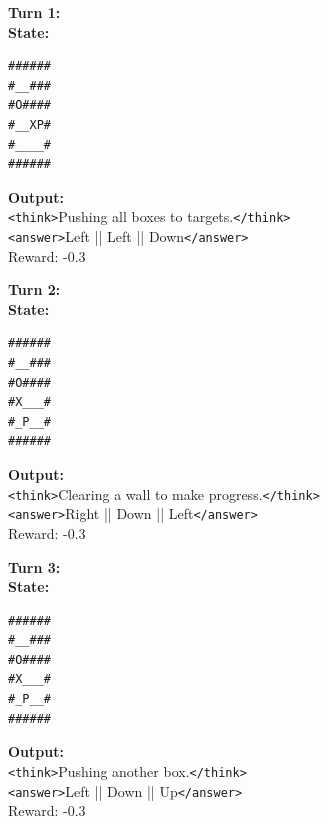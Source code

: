 \begin{figure}[t]
\centering
\small
\begin{tcolorbox}[colback=gray!2, colframe=black, boxrule=0.5pt, arc=2pt, width=0.95\linewidth, title=0.5B Sokoban – Multi-Turn Rollout]
\textbf{Turn 1:} \\
\textbf{State:}
\begin{verbatim}
######
#__###
#O####
#__XP#
#____#
######
\end{verbatim}
\textbf{Output:} \\
\texttt{<think>}Pushing all boxes to targets.\texttt{</think>} \\
\texttt{<answer>}Left || Left || Down\texttt{</answer>} \\
Reward: -0.3

\vspace{4pt}
\textbf{Turn 2:} \\
\textbf{State:}
\begin{verbatim}
######
#__###
#O####
#X___#
#_P__#
######
\end{verbatim}
\textbf{Output:} \\
\texttt{<think>}Clearing a wall to make progress.\texttt{</think>} \\
\texttt{<answer>}Right || Down || Left\texttt{</answer>} \\
Reward: -0.3

\vspace{4pt}
\textbf{Turn 3:} \\
\textbf{State:}
\begin{verbatim}
######
#__###
#O####
#X___#
#_P__#
######
\end{verbatim}
\textbf{Output:} \\
\texttt{<think>}Pushing another box.\texttt{</think>} \\
\texttt{<answer>}Left || Down || Up\texttt{</answer>} \\
Reward: -0.3
\end{tcolorbox}
\vspace{4pt}
\end{figure}


